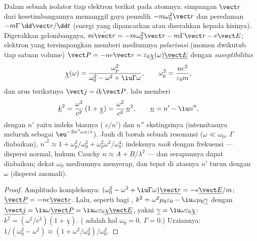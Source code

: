 \begin{proposition}\label{prop:b2:waves-in-media:lorentz}
Dalam sebuah isolator tiap elektron terikat pada atomnya: simpangan
$\vect r$ dari kesetimbangannya memanggil gaya pemulih $-m\omega_0^2\vect r$ dan
peredaman $-m\Gamma\,\dd\vect r/\dd t$ (energi yang dipancarkan atau diserahkan kepada
kisinya). Digerakkan gelombangnya, $m\ddot{\vect r} = -m\omega_0^2\vect r - m\Gamma\dot{\vect r}
- e\vect E$; elektron yang tersimpangkan memberi mediumnya \emph{polarisasi}
(momen dwikutub tiap satuan volume) $\vect P = -ne\vect r = \varepsilon_0\underline\chi(\omega)
\underline{\vect E}$ dengan \emph{suseptibilitas}
\[
\underline\chi(\omega) = \frac{\omega_p^2}{\omega_0^2 - \omega^2 + \iu\Gamma\omega} ,
\qquad \omega_p^2 = \frac{ne^2}{\varepsilon_0m} ,
\]
dan arus terikatnya $\vect j = \partial_t\vect P$.  lalu memberi
\[
\underline k^2 = \frac{\omega^2}{c^2}\,(1 + \underline\chi) = \frac{\omega^2}{c^2}\,\underline n^2 ,
\qquad \underline n = n' - \iu n'' ,
\]
dengan $n'$ yaitu indeks biasnya ( $c/n'$) dan $n''$
ekstingsinya (intensitasnya meluruh sebagai $\eu^{-2n''\omega x/c}$). Jauh di bawah sebuah
resonansi ($\omega \ll \omega_0$, $\Gamma$ diabaikan), $n'^2 \approx 1 + \omega_p^2/\omega_0^2 +
\omega_p^2\omega^2/\omega_0^4$: indeksnya \emph{naik} dengan frekuensi --- dispersi
normal, hukum Cauchy $n \approx A + B/\lambda^2$ --- dan serapannya
dapat diabaikan; dekat $\omega_0$ mediumnya menyerap, dan tepat di atasnya $n'$
turun dengan $\omega$ (dispersi anomali).
\end{proposition}

\begin{proof}
Amplitudo kompleksnya: $(\omega_0^2 - \omega^2 + \iu\Gamma\omega)\underline{\vect r} = -e\underline{\vect E}
/m$; $\underline{\vect P} = -ne\underline{\vect r}$. Lalu, seperti bagi , $k^2 = \omega^2\mu_0
\varepsilon_0 - \iu\omega\mu_0\underline\gamma$ dengan $\underline{\vect j} = \iu\omega\underline{\vect P} = \iu\omega\varepsilon_0
\underline\chi\underline{\vect E}$, yakni $\underline\gamma = \iu\omega\varepsilon_0\underline\chi$: $k^2 = (\omega^2/c^2)
(1 + \underline\chi)$. ( adalah hal $\omega_0 = 0$, $\Gamma = 0$.)
Uraiannya: $1/(\omega_0^2 - \omega^2) \approx (1 + \omega^2/\omega_0^2)/\omega_0^2$.
\end{proof}

